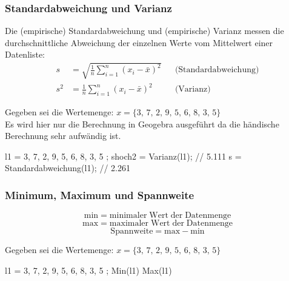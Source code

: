 \subsubsection*{Standardabweichung und Varianz}
Die (empirische) Standardabweichung und (empirische) Varianz messen die durchschnittliche Abweichung der einzelnen Werte vom Mittelwert einer Datenliste:
\begin{align}
    s &= \sqrt{\frac{1}{n} \sum_{i=1}^{n} (x_i - \bar{x})^2} && \text{(Standardabweichung)} \\
    s^2 &= \frac{1}{n} \sum_{i=1}^{n} (x_i - \bar{x})^2 && \text{(Varianz)}
\end{align}
\begin{bsp}
Gegeben sei die Wertemenge: \( x = \{3,\, 7,\, 2,\, 9,\, 5,\, 6,\, 8,\, 3,\, 5 \} \) \\ 
Es wird hier nur die Berechnung in Geogebra ausgeführt da die händische Berechnung sehr aufwändig ist.
\begin{geogebracode}
    l1 = { 3, 7, 2, 9, 5, 6, 8, 3, 5 };
    shoch2 = Varianz(l1); // 5.111
    s = Standardabweichung(l1); // 2.261
\end{geogebracode}
\end{bsp}

\subsubsection*{Minimum, Maximum und Spannweite}
\begin{equation}
    \mathrm{min} = \mathrm{minimaler\; Wert\; der\; Datenmenge}
\end{equation}
\begin{equation}
    \mathrm{max} = \mathrm{maximaler\; Wert\; der\; Datenmenge}
\end{equation}
\begin{equation}
    \mathrm{Spannweite} = \mathrm{max} - \mathrm{min}
\end{equation}

\begin{bsp}
Gegeben sei die Wertemenge: \( x = \{3,\, 7,\, 2,\, 9,\, 5,\, 6,\, 8,\, 3,\, 5 \} \) \\ 
\begin{geogebracode}
    l1 = { 3, 7, 2, 9, 5, 6, 8, 3, 5 };
    Min(l1)
    Max(l1)
\end{geogebracode}
\end{bsp}

